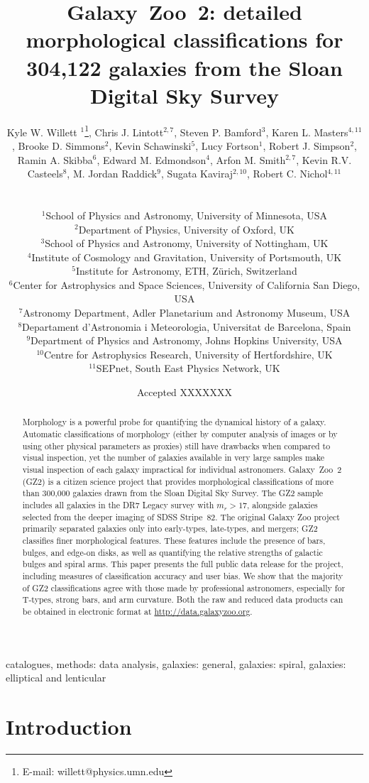 \documentclass[useAMS,usenatbib]{mn2e}
\title[GZ2 data release]{Galaxy~Zoo~2: detailed morphological classifications for 304,122 galaxies from the Sloan Digital Sky Survey}
\author[Willett et al.]{
  \parbox[t]{16cm}{
  Kyle W. Willett $^{1}$\thanks{E-mail: willett@physics.umn.edu},
  Chris J. Lintott$^{2,7}$,
  Steven P. Bamford$^{3}$,
  Karen L. Masters$^{4,11}$,
  Brooke D. Simmons$^{2}$,
  Kevin Schawinski$^{5}$,
  Lucy Fortson$^{1}$,
  Robert J. Simpson$^{2}$,
  Ramin A. Skibba$^{6}$,
  Edward M. Edmondson$^{4}$,
  Arfon M. Smith$^{2,7}$,
  Kevin R.V. Casteels$^{8}$,
  M. Jordan Raddick$^{9}$,
  Sugata Kaviraj$^{2,10}$,
  Robert C. Nichol$^{4,11}$\\
  }\\
$^{1}$School of Physics and Astronomy, University of Minnesota, USA \\
$^{2}$Department of Physics, University of Oxford, UK \\
$^{3}$School of Physics and Astronomy, University of Nottingham, UK \\
$^{4}$Institute of Cosmology and Gravitation, University of Portsmouth, UK \\
$^{5}$Institute for Astronomy, ETH, Z\"urich, Switzerland \\
$^{6}$Center for Astrophysics and Space Sciences, University of California San Diego, USA \\
$^{7}$Astronomy Department, Adler Planetarium and Astronomy Museum, USA \\
$^{8}$Departament d'Astronomia i Meteorologia, Universitat de Barcelona, Spain \\
$^{9}$Department of Physics and Astronomy, Johns Hopkins University, USA \\
$^{10}$Centre for Astrophysics Research, University of Hertfordshire, UK \\
$^{11}$SEPnet, South East Physics Network, UK \\
}
\begin{document}
\date{Accepted XXXXXXX}

\pagerange{\pageref{firstpage}--\pageref{lastpage}} 

\maketitle

\label{firstpage}

\begin{abstract}
Morphology is a powerful probe for quantifying the dynamical history of a galaxy. Automatic classifications of morphology (either by computer analysis of images or by using other physical parameters as proxies) still have drawbacks when compared to visual inspection, yet the number of galaxies available in very large samples make visual inspection of each galaxy impractical for individual astronomers. Galaxy~Zoo~2 (GZ2) is a citizen science project that provides morphological classifications of more than 300,000 galaxies drawn from the Sloan Digital Sky Survey. The GZ2 sample includes all galaxies in the DR7 Legacy survey with $m_r>17$, alongside galaxies selected from the deeper imaging of SDSS Stripe~82. The original Galaxy Zoo project primarily separated galaxies only into early-types, late-types, and mergers; GZ2 classifies finer morphological features. These features include the presence of bars, bulges, and edge-on disks, as well as quantifying the relative strengths of galactic bulges and spiral arms. This paper presents the full public data release for the project, including measures of classification accuracy and user bias. We show that the majority of GZ2 classifications agree with those made by professional astronomers, especially for T-types, strong bars, and arm curvature. Both the raw and reduced data products can be obtained in electronic format at \url{http://data.galaxyzoo.org}.
\end{abstract}

\begin{keywords}
catalogues, methods: data analysis, galaxies: general, galaxies: spiral, galaxies: elliptical and lenticular
\end{keywords}


\section{Introduction} \label{sec-intro}
\end{document}
